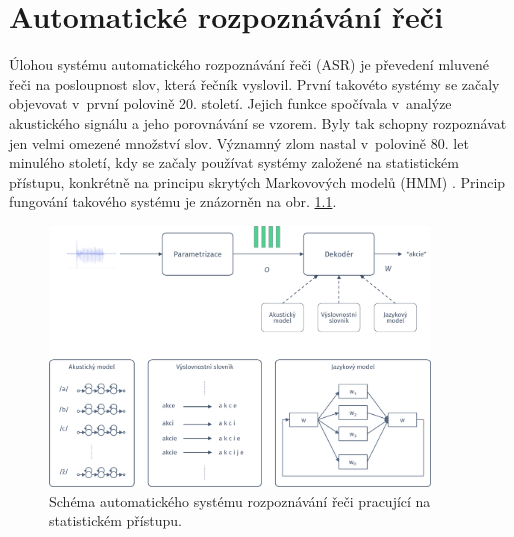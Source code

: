 \chapter{Automatické rozpoznávání řeči}
\label{chap:asr}

Úlohou systému automatického rozpoznávání řeči (ASR) je převedení mluvené řeči na posloupnost slov, která řečník vyslovil. První takovéto systémy se začaly objevovat v~první polovině 20. století. Jejich funkce spočívala v~analýze akustického signálu a jeho porovnávání se vzorem. Byly tak schopny rozpoznávat jen velmi omezené množství slov. Významný zlom nastal v~polovině 80. let minulého století, kdy se začaly používat systémy založené na statistickém přístupu, konkrétně na principu skrytých Markovových modelů (HMM) \cite{Holmes2001}.
Princip fungování takového systému je znázorněn na obr. \ref{fig:asr:decoding}.

\begin{figure}[hbpt]
  \centering
  \includegraphics[width=0.9\textwidth]{./parts/ch4-asr/img/decoding.pdf}
  \caption[Schéma ASR systému pracující se statistickou.]{Schéma automatického systému rozpoznávání řeči pracující na statistickém přístupu.}
  \label{fig:asr:decoding}
\end{figure}

